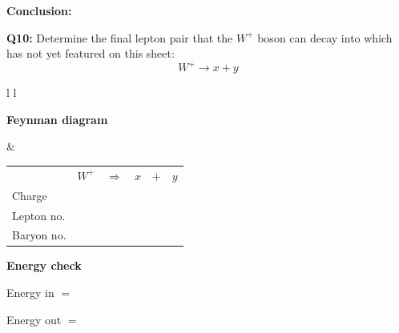 \documentclass[12pt]{article}
\begin{document}
\vspace{0.5cm}

\textbf{Conclusion:}

\vspace{2.5cm}

\newpage
\textbf{Q10:} Determine the final lepton pair that the $W^+$ boson can decay into which has not yet featured on this sheet:
\[
W^+ \rightarrow x + y
\]

\vspace{0.5cm}

\begin{tabular}{l l}

\begin{minipage}[t]{0.46\textwidth}
\vspace{0pt}
\textbf{Feynman diagram}

\vspace{0.6cm}

\begin{tikzpicture}
\begin{feynman}
  \vertex (W) at (0,2) {};
  \vertex [coordinate] (v) at (3,2) {};

  \vertex (x) at (4,4) {\(x\)};
  \vertex (y) at (5,3) {\(y\)};

  \diagram*{
    (W) -- [boson, edge label=\(W^+\), momentum'={}] (v),
    (v) -- [fermion] (x),
    (v) -- [fermion] (y),
  };
\end{feynman}
\end{tikzpicture}
\end{minipage}
&
\begin{minipage}[t]{0.50\textwidth}
\vspace{0pt}

\renewcommand{\arraystretch}{1.4}
\begin{tabular}{@{}l c c c c c@{}}
 & \(W^+\) & \(\Rightarrow\) & \(x\) & \(+\) & \(y\) \\
Charge &  &  &  &  &  \\
Lepton no. &  &  &  &  &  \\
Baryon no. &  &  &  &  &  \\
\end{tabular}

\vspace{0.6cm}

\textbf{Energy check}

Energy in $=$

Energy out $=$

\end{minipage}

\end{tabular}
\end{document}
